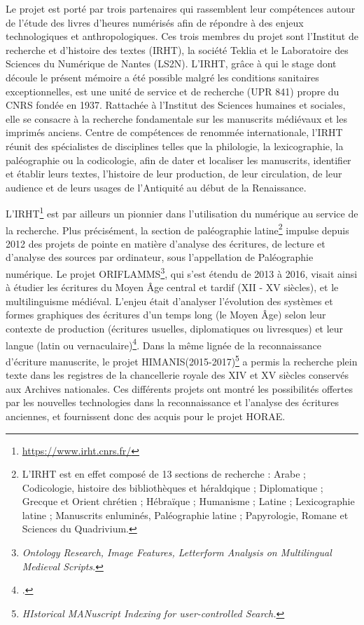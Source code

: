 \documentclass[a4paper,12pt,twoside]{book}
\begin{document}
	Le projet est porté par trois partenaires qui rassemblent leur compétences autour de l'étude des livres d'heures numérisés afin de répondre à des enjeux technologiques et anthropologiques. Ces trois membres du projet sont l'Institut de recherche et d’histoire des textes (IRHT), la société Teklia et le Laboratoire des Sciences du Numérique de Nantes (LS2N). L'IRHT, grâce à qui le stage dont découle le présent mémoire a été possible malgré les conditions sanitaires exceptionnelles, est une unité de service et de recherche (UPR 841) propre du CNRS fondée en 1937. Rattachée à l’Institut des Sciences humaines et sociales, elle se consacre à la recherche fondamentale sur les manuscrits médiévaux et les imprimés anciens. Centre de compétences de renommée internationale, l'IRHT réunit des spécialistes de disciplines telles que la philologie, la lexicographie, la paléographie ou la codicologie, afin de dater et localiser les manuscrits, identifier et établir leurs textes, l'histoire de leur production, de leur circulation, de leur audience et de leurs usages de l'Antiquité au début de la Renaissance. 

L'IRHT\footnote{\url{https://www.irht.cnrs.fr/}} est par ailleurs un pionnier dans l'utilisation du numérique au service de la recherche. Plus précisément, la section de paléographie latine\footnote{L'IRHT est en effet composé de 13 sections de recherche : Arabe ; Codicologie, histoire des bibliothèques et héraldqique ; Diplomatique ; Grecque et Orient chrétien ; Hébraïque ; Humanisme ; Latine ; Lexicographie latine ; Manuscrits enluminés, Paléographie latine ; Papyrologie, Romane et Sciences du Quadrivium.} impulse depuis 2012 des projets de pointe en matière d’analyse des écritures, de lecture et d’analyse des sources par ordinateur, sous l'appellation de \og Paléographie numérique\fg{}. Le projet ORIFLAMMS\footnote{\textit{Ontology Research, Image Features, Letterform Analysis on Multilingual Medieval Scripts}.}, qui s'est étendu de 2013 à 2016, visait ainsi à étudier les écritures du Moyen Âge central et tardif (\textsc{XII} - \textsc{XV} siècles), et le multilinguisme médiéval. L'enjeu était d'analyser l’évolution des systèmes et formes graphiques des écritures d’un temps long (le Moyen Âge) selon leur contexte de production (écritures usuelles, diplomatiques ou livresques) et leur langue (latin ou vernaculaire)\footcite[p. 81]{oriflamms}. Dans la même lignée de la reconnaissance d'écriture manuscrite, le projet HIMANIS(2015-2017)\footnote{\textit{HIstorical MANuscript Indexing for user-controlled Search.}} a permis la recherche plein texte dans les registres de la chancellerie royale des \textsc{XIV} et \textsc{XV} siècles conservés aux Archives nationales. Ces différents projets ont montré les possibilités offertes par les nouvelles technologies dans la reconnaissance et l'analyse des écritures anciennes, et fournissent donc des acquis pour le projet HORAE. 
\end{document}
